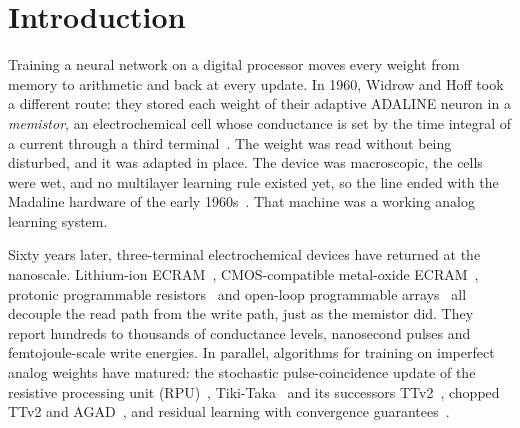 \section{Introduction}\label{sec:intro}

Training a neural network on a digital processor moves every weight from memory to arithmetic and back at every update.
In 1960, Widrow and Hoff took a different route: they stored each weight of their adaptive ADALINE neuron in a
\emph{memistor}, an electrochemical cell whose conductance is set by the time integral of a current through a third
terminal~\cite{widrow1960adaline,widrow1960switching,widrow1990}. The weight was read without being disturbed, and it was
adapted in place. The device was macroscopic, the cells were wet, and no multilayer learning rule existed yet, so the line ended
with the Madaline hardware of the early 1960s~\cite{widrow1990}. That machine was a working analog learning system.

Sixty years later, three-terminal electrochemical devices have returned at the nanoscale. Lithium-ion
ECRAM~\cite{tang2018,fuller2017}, CMOS-compatible metal-oxide ECRAM~\cite{kim2019}, protonic programmable
resistors~\cite{onen2022,xu2026} and open-loop programmable arrays~\cite{chen2023} all decouple the read path from the write path,
just as the memistor did. They report hundreds to thousands of conductance levels, nanosecond pulses and femtojoule-scale write
energies. In parallel, algorithms for training on imperfect analog weights have matured: the stochastic pulse-coincidence update
of the resistive processing unit (RPU)~\cite{gokmen2016}, Tiki-Taka~\cite{gokmen2020} and its successors
TTv2~\cite{gokmen2021}, chopped TTv2 and AGAD~\cite{rasch2024}, and residual learning with convergence guarantees~\cite{wu2025}.

